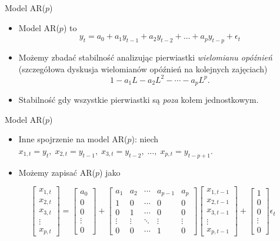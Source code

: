 \documentclass[11pt,usenames,dvipsnames,aspectratio=169]{beamer}
\begin{document}
\begin{frame}{Model AR($p$)}
\begin{itemize}
    \item Model AR($p$) to
    \[
    y_{t}=a_{0}+a_{1}y_{t-1}+a_{2}y_{t-2}+\ldots+a_{p}y_{t-p}+\epsilon_{t}
    \]
    \item Możemy zbadać stabilność analizując pierwiastki \emph{wielomianu opóźnień} (szczegółowa dyskusja wielomianów opóźnień na kolejnych zajęciach)
    \[
    1-a_{1}L-a_{2}L^{2}-\cdots-a_{p}L^{p}.
    \]
    \item Stabilność gdy wszystkie pierwiastki są \emph{poza} kołem jednostkowym.
\end{itemize}
\end{frame}

\begin{frame}{Model AR($p$)}
\begin{itemize}
    \item Inne spojrzenie na model AR($p$): niech $x_{1,t}=y_{t},\; x_{2,t}=y_{t-1},\; x_{3,t}=y_{t-2},\;\ldots,\; x_{p,t}=y_{t-p+1}$.
    \item Możemy zapisać AR($p$) jako
\end{itemize}
{\small
\[
\begin{bmatrix}
x_{1,t}\\ x_{2,t}\\ x_{3,t}\\ \vdots\\ x_{p,t}
\end{bmatrix}
=
\begin{bmatrix}
a_{0}\\ 0\\ 0\\ \vdots\\ 0
\end{bmatrix}
+
\begin{bmatrix}
a_{1} & a_{2} & \cdots & a_{p-1} & a_{p}\\
1     & 0     & \cdots & 0       & 0\\
0     & 1     & \cdots & 0       & 0\\
\vdots& \vdots& \ddots & \vdots  & \vdots\\
0     & 0     & \cdots & 1       & 0
\end{bmatrix}
\begin{bmatrix}
x_{1,t-1}\\ x_{2,t-1}\\ x_{3,t-1}\\ \vdots\\ x_{p,t-1}
\end{bmatrix}
+
\begin{bmatrix}
1\\ 0\\ 0\\ \vdots\\ 0
\end{bmatrix}\epsilon_{t}
\]
}
\end{frame}
\end{document}
